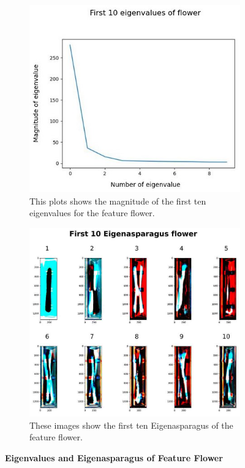 \begin{figure}[!h]
	\centering
	\begin{subfigure}{0.7\textwidth}
		\includegraphics[width=0.9\linewidth]{Figures/chapter04/pca_flower_graph.png} 
		\caption{This plots shows the magnitude of the first ten eigenvalues for the feature flower.}
	\end{subfigure}
	\vspace{20pt}
	
	\begin{subfigure}{0.9\textwidth}
		\includegraphics[width=0.9\linewidth]{Figures/chapter04/pca_flower.png}
		\caption{These images show the first ten Eigenasparagus of the feature flower.}
	\end{subfigure}
    \caption[First Ten Eigenvalues and Eigenasparagus of Feature Flower]{\textbf{Eigenvalues and Eigenasparagus of Feature Flower}}
    \label{fig:PCAflower}
\end{figure}

